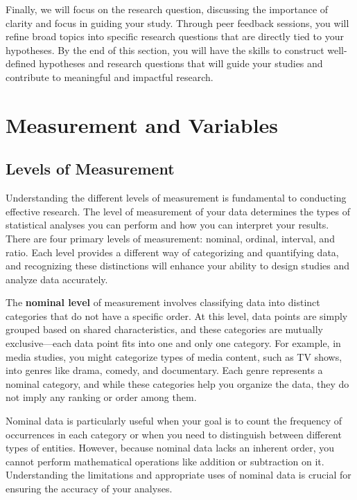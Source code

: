 \documentclass[
]{book}
\begin{document}
Finally, we will focus on the research question, discussing the importance of clarity and focus in guiding your study. Through peer feedback sessions, you will refine broad topics into specific research questions that are directly tied to your hypotheses. By the end of this section, you will have the skills to construct well-defined hypotheses and research questions that will guide your studies and contribute to meaningful and impactful research.

\section{Measurement and Variables}\label{measurement-and-variables}

\subsection{Levels of Measurement}\label{levels-of-measurement}

Understanding the different levels of measurement is fundamental to conducting effective research. The level of measurement of your data determines the types of statistical analyses you can perform and how you can interpret your results. There are four primary levels of measurement: nominal, ordinal, interval, and ratio. Each level provides a different way of categorizing and quantifying data, and recognizing these distinctions will enhance your ability to design studies and analyze data accurately.

The \textbf{nominal level} of measurement involves classifying data into distinct categories that do not have a specific order. At this level, data points are simply grouped based on shared characteristics, and these categories are mutually exclusive---each data point fits into one and only one category. For example, in media studies, you might categorize types of media content, such as TV shows, into genres like drama, comedy, and documentary. Each genre represents a nominal category, and while these categories help you organize the data, they do not imply any ranking or order among them.

Nominal data is particularly useful when your goal is to count the frequency of occurrences in each category or when you need to distinguish between different types of entities. However, because nominal data lacks an inherent order, you cannot perform mathematical operations like addition or subtraction on it. Understanding the limitations and appropriate uses of nominal data is crucial for ensuring the accuracy of your analyses.
\end{document}
